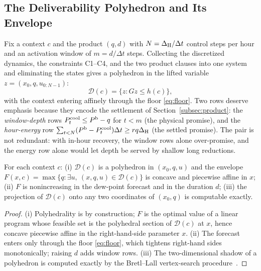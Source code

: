 \subsection{The Deliverability Polyhedron and Its Envelope}
\label{subsec:envelope}

Fix a context $c$ and the product $(q,d)$ with $N=\Delta_{\mathrm{H}}/\Delta t$ control steps
per hour and an activation window of $m=d/\Delta t$ steps. Collecting the
discretized dynamics, the constraints C1--C4, and the two product clauses
into one system and eliminating the states gives a polyhedron in the lifted
variable $z=(x_0, q, u_{0:N-1})$:
\begin{equation}
\mathcal{D}(c) = \bigl\{ z : G z \le h(c) \bigr\},
\label{eq:lifted}
\end{equation}
with the context entering affinely through the floor \eqref{eq:floor}. Two
rows deserve emphasis because they encode the settlement of
Section~\ref{subsec:product}: the \emph{window-depth} rows
$P^{\mathrm{cool}}_t \le P^{\mathrm{b}} - q$ for $t<m$ (the physical promise), and the
\emph{hour-energy} row
$\sum_{t<N}(P^{\mathrm{b}}-P^{\mathrm{cool}}_t)\Delta t \ge r q \Delta_{\mathrm{H}}$ (the settled promise). The
pair is not redundant: with in-hour recovery, the window rows alone
over-promise, and the energy row alone would let depth be served by shallow
long reductions.

\begin{theorem}\label{thm:envelope}
For each context $c$: (i) $\mathcal{D}(c)$ is a polyhedron in $(x_0,q,u)$ and
the envelope $F(x,c)=\max\{q:\exists u,\ (x,q,u)\in\mathcal{D}(c)\}$ is
concave and piecewise affine in $x$; (ii) $F$ is nonincreasing in the
dew-point forecast and in the duration $d$; (iii) the projection of
$\mathcal{D}(c)$ onto any two coordinates of $(x_0,q)$ is computable exactly.
\end{theorem}

\begin{proof}
(i) Polyhedrality is by construction; $F$ is the optimal value of a linear
program whose feasible set is the polyhedral section of $\mathcal{D}(c)$ at
$x$, hence concave piecewise affine in the right-hand-side parameter $x$.
(ii) The forecast enters only through the floor \eqref{eq:floor}, which
tightens right-hand sides monotonically; raising $d$ adds window rows.
(iii) The two-dimensional shadow of a polyhedron is computed exactly by the
Bretl--Lall vertex-search procedure~\cite{bretl2008testing}.
\end{proof}

